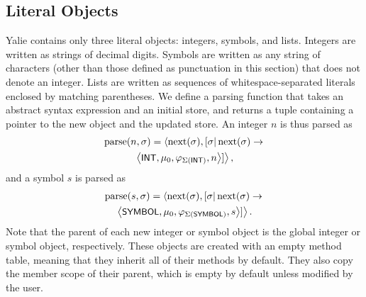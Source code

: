 \documentclass[twocolumn]{article}
\begin{document}
\subsection*{Literal Objects}
Yalie contains only three literal objects: integers, symbols, and
lists. Integers are written as strings of decimal digits. Symbols are
written as any string of characters (other than those defined as
punctuation in this section) that does not denote an integer. Lists
are written as sequences of whitespace-separated literals enclosed by
matching parentheses. We define a parsing function that takes an
abstract syntax expression and an initial store, and returns a tuple
containing a pointer to the new object and the updated store.  An
integer $n$ is thus parsed as
\begin{multline*}
\operatorname{parse}(n,\sigma) =
\left<\operatorname{next}(\sigma),[\sigma|\operatorname{next}(\sigma) \rightarrow\right. \\
\left.\left<\text{\sf \small INT}, \mu_0, \varphi_{\Sigma(\text{\sf INT})}, n\right>]\right>,
\end{multline*}
and a symbol $s$ is parsed as
\begin{multline*}
  \operatorname{parse}(s,\sigma) =
  \left<\operatorname{next}(\sigma),[\sigma|\operatorname{next}(\sigma) \rightarrow\right. \\
\left.\left<\text{\sf \small SYMBOL}, \mu_0, \varphi_{\Sigma(\text{\sf SYMBOL})},
  s\right>]\right>.
\end{multline*}
Note that the parent of each new integer or symbol object is the
global integer or symbol object, respectively. These objects are
created with an empty method table, meaning that they inherit all of
their methods by default. They also copy the member scope of their
parent, which is empty by default unless modified by the user.
\end{document}
